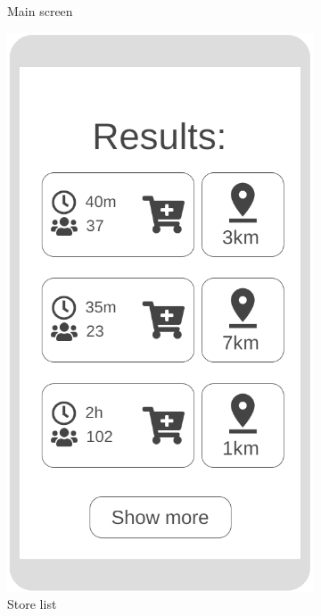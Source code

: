 \begin{figure}[h!]
\begin{subfigure}[b]{0.3\textwidth}
		\caption{Main screen}
		\label{fig:WfMain}
	\end{subfigure}
	\hfill
	\begin{subfigure}[b]{0.3\textwidth}
		\includegraphics[width=\linewidth]{../Diagrams/WireframesCLup/QuickTicket.png}
		\caption{Store list}
		\label{fig:WfStoreList}
	\end{subfigure}
	\hfill
	\begin{subfigure}[b]{0.3\textwidth}

\end{subfigure}
\end{figure}
